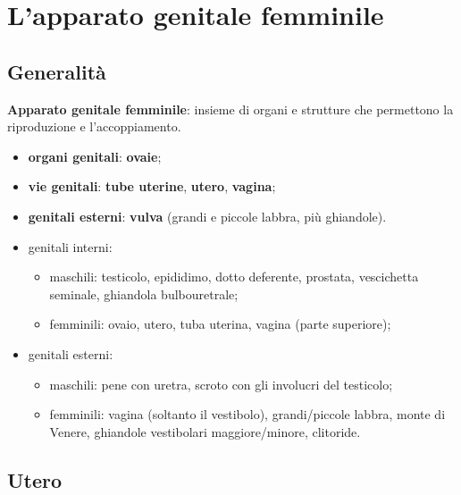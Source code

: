 \chapter{L'apparato genitale femminile}

\section{Generalità}

\textbf{Apparato genitale femminile}: insieme di organi e strutture che permettono la
riproduzione e l'accoppiamento.

\begin{itemize}
  \item \textbf{organi genitali}: \textbf{ovaie};
  \item \textbf{vie genitali}: \textbf{tube uterine}, \textbf{utero}, \textbf{vagina};
  \item \textbf{genitali esterni}: \textbf{vulva} (grandi e piccole labbra, più ghiandole).
\end{itemize}

\begin{itemize}
  \item genitali interni:
  \begin{itemize}
    \item maschili: testicolo, epididimo, dotto deferente, prostata, vescichetta seminale,
      ghiandola bulbouretrale;
    \item femminili: ovaio, utero, tuba uterina, vagina (parte superiore);
  \end{itemize}
  \item genitali esterni:
  \begin{itemize}
    \item maschili: pene con uretra, scroto con gli involucri del testicolo;
    \item femminili: vagina (soltanto il vestibolo), grandi/piccole labbra, monte di Venere,
      ghiandole vestibolari maggiore/minore, clitoride.
  \end{itemize}
\end{itemize}

\section{Utero}

